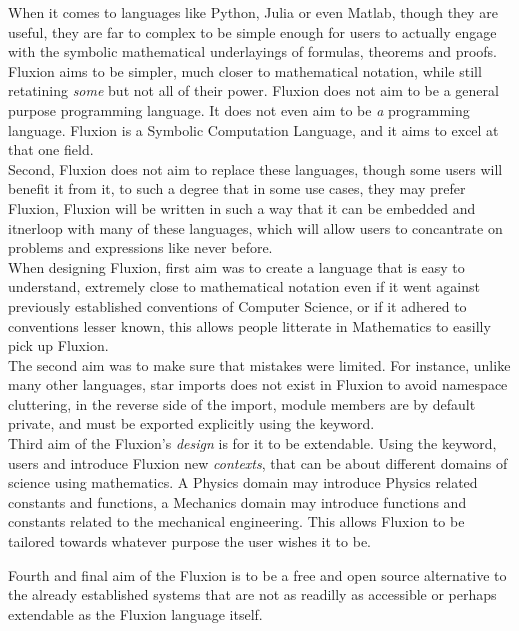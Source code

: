 \documentclass[11pt,a4paper]{book}
\begin{document}
When it comes to languages like Python, Julia or even Matlab, though they are useful, they are far to complex to be simple enough for users to actually engage with the symbolic mathematical underlayings of formulas, theorems and proofs. Fluxion aims to be simpler, much closer to mathematical notation, while still retatining \textit{some} but not all of their power. Fluxion does not aim to be a general purpose programming language. It does not even aim to be \textit{a} programming language. Fluxion is a Symbolic Computation Language, and it aims to excel at that one field.\\

Second, Fluxion does not aim to replace these languages, though some users will benefit it from it, to such a degree that in some use cases, they may prefer Fluxion, Fluxion will be written in such a way that it can be embedded and itnerloop with many of these languages, which will allow users to concantrate on problems and expressions like never before.\\

When designing Fluxion, first aim was to create a language that is easy to understand, extremely close to mathematical notation even if it went against previously established conventions of Computer Science, or if it adhered to conventions lesser known, this allows people litterate in Mathematics to easilly pick up Fluxion.\\

The second aim was to make sure that mistakes were limited. For instance, unlike many other languages, star imports does not exist in Fluxion to avoid namespace cluttering, in the reverse side of the import, module members are by default private, and must be exported explicitly using the  keyword.\\

Third aim of the Fluxion's \textit{design} is for it to be extendable. Using the  keyword, users and introduce Fluxion new \textit{contexts}, that can be about different domains of science using mathematics. A Physics domain may introduce Physics related constants and functions, a Mechanics domain may introduce functions and constants related to the mechanical engineering. This allows Fluxion to be tailored towards whatever purpose the user wishes it to be.

Fourth and final aim of the Fluxion is to be a free and open source alternative to the already established systems that are not as readilly as accessible or perhaps extendable as the Fluxion language itself.
\end{document}
